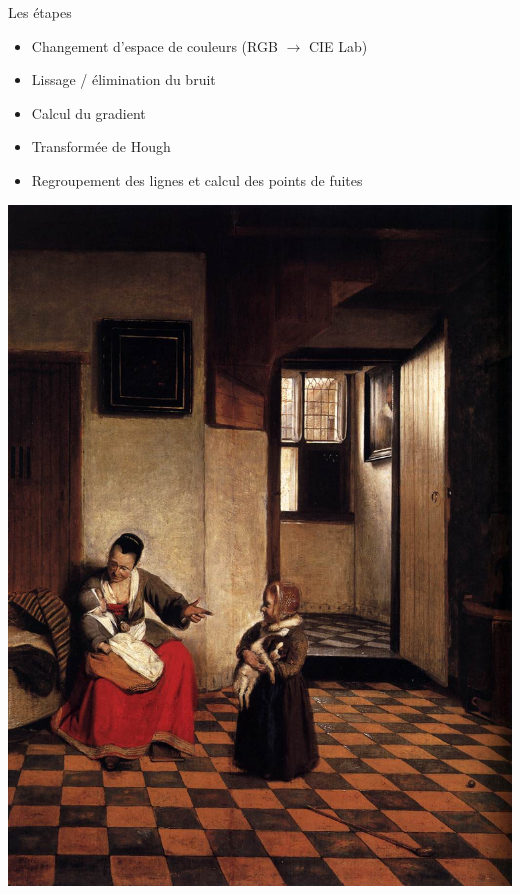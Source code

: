 \documentclass{beamer}
\begin{document}
	\begin{frame}{Les étapes}
		\begin{itemize}
			\small \item Changement d'espace de couleurs (RGB $\rightarrow$ CIE Lab)
			\small \item Lissage / élimination du bruit
			\small \item Calcul du gradient
			\small \item Transformée de Hough
			\small \item Regroupement des lignes et calcul des points de fuites
		\end{itemize}
		\centering
		\includegraphics[scale=0.33]{hooch1.jpg}

\end{frame}
\end{document}

